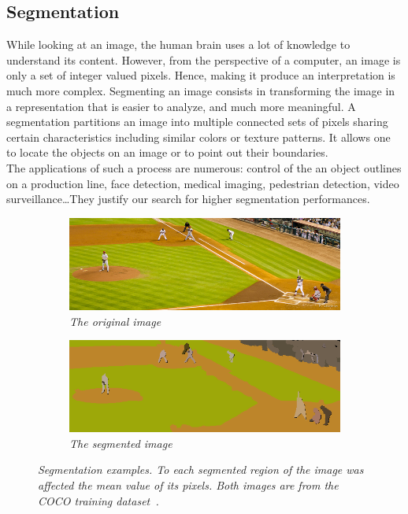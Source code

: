 \documentclass{article}
\begin{document}
    \subsection{Segmentation}
        While looking at an image, the human brain uses a lot of knowledge to understand its content. However, from the perspective of a computer, an image is only a set of integer valued pixels. Hence, making it produce an interpretation is much more complex. Segmenting an image consists in transforming the image in a representation that is easier to analyze, and much more meaningful. A segmentation partitions an image into multiple connected sets of pixels sharing certain characteristics including similar colors or texture patterns. It allows one to locate the objects on an image or to point out their boundaries.\\
        The applications of such a process are numerous: control of the an object outlines on a production line, face detection, medical imaging, pedestrian detection, video surveillance\ldots They justify our search for higher segmentation performances.

        \begin{figure}[!ht]
        \centering
        \begin{subfigure}{.49\linewidth}
            \centering
            \includegraphics[width=0.9\linewidth]{pics/img_segm1.jpg}
            \caption{\textit{The original image}}
        \end{subfigure}
        \begin{subfigure}{.49\linewidth}
            \centering
            \includegraphics[width=0.9\linewidth]{pics/img_segm2.png}
            \caption{\textit{The segmented image}}
        \end{subfigure}
            \caption{\textit{Segmentation examples. To each segmented region of the image was affected the mean value of its pixels. Both images are from the COCO training dataset~\cite{microsoft2014}.}}
            \label{fig:segm}
        \end{figure}
\end{document}
